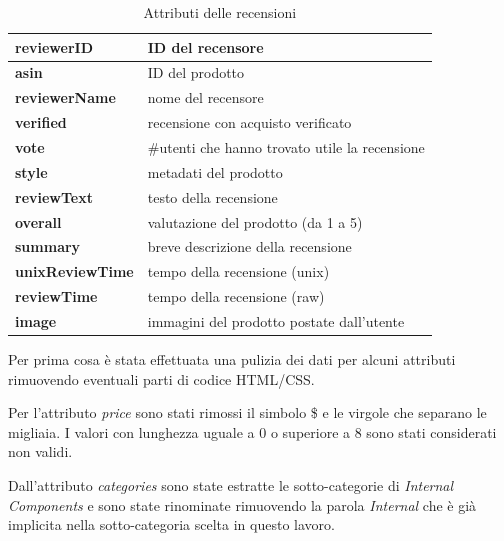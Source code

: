 \begin{table}[ht]
\centering
\begin{tabular}{|p{3.5cm}|p{7.5cm}|}
\hline
\textbf{reviewerID}     & ID del recensore                                    \\ \hline
\textbf{asin}           & ID del prodotto                                     \\ \hline
\textbf{reviewerName}   & nome del recensore                                  \\ \hline
\textbf{verified}       & recensione con acquisto verificato                  \\ \hline
\textbf{vote}           & \#utenti che hanno trovato utile la recensione      \\ \hline
\textbf{style}          & metadati del prodotto                               \\ \hline
\textbf{reviewText}     & testo della recensione                              \\ \hline
\textbf{overall}        & valutazione del prodotto (da 1 a 5)                 \\ \hline
\textbf{summary}        & breve descrizione della recensione                  \\ \hline
\textbf{unixReviewTime} & tempo della recensione (unix)                       \\ \hline
\textbf{reviewTime}     & tempo della recensione (raw)                        \\ \hline
\textbf{image}          & immagini del prodotto postate dall'utente           \\ \hline
\end{tabular}
\caption{Attributi delle recensioni}
\label{tab:attr-reviews}
\end{table}

Per prima cosa è stata effettuata una pulizia dei dati per alcuni attributi rimuovendo eventuali parti di codice HTML/CSS.

Per l'attributo \textit{price} sono stati rimossi il simbolo \$ e le virgole che separano le migliaia. I valori con lunghezza uguale a 0 o superiore a 8 sono stati considerati non validi.

Dall'attributo \textit{categories} sono state estratte le sotto-categorie di \textit{Internal Components} e sono state rinominate rimuovendo la parola \textit{Internal} che è già implicita nella sotto-categoria scelta in questo lavoro.


